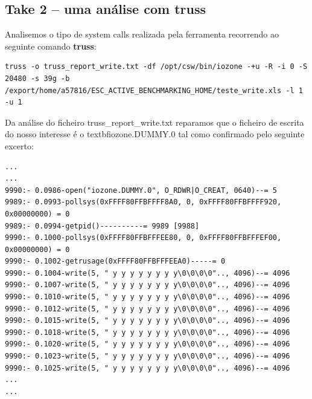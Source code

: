 \documentclass[a4paper]{article}
\begin{document}
{\subsection{Take 2 -- uma análise com truss}

Analisemos o tipo de system calls realizada pela ferramenta recorrendo ao seguinte comando \textbf{truss}:

\begin{lstlisting}[style=command]
truss -o truss_report_write.txt -df /opt/csw/bin/iozone -+u -R -i 0 -S 20480 -s 39g -b /export/home/a57816/ESC_ACTIVE_BENCHMARKING_HOME/teste_write.xls -l 1 -u 1 
\end{lstlisting}

Da análise do ficheiro truss\_report\_write.txt reparamos que o ficheiro de escrita do nosso interesse é o textbf{iozone.DUMMY.0} tal como confirmado pelo seguinte excerto: 
\begin{lstlisting}
...
...
9990:- 0.0986-open("iozone.DUMMY.0", O_RDWR|O_CREAT, 0640)--= 5
9989:- 0.0993-pollsys(0xFFFF80FFBFFFF8A0, 0, 0xFFFF80FFBFFFF920, 0x00000000) = 0
9989:- 0.0994-getpid()----------= 9989 [9988]
9990:- 0.1000-pollsys(0xFFFF80FFBFFFEE80, 0, 0xFFFF80FFBFFFEF00, 0x00000000) = 0
9990:- 0.1002-getrusage(0xFFFF80FFBFFFEEA0)-----= 0
9990:- 0.1004-write(5, " y y y y y y y y\0\0\0\0".., 4096)--= 4096
9990:- 0.1007-write(5, " y y y y y y y y\0\0\0\0".., 4096)--= 4096
9990:- 0.1010-write(5, " y y y y y y y y\0\0\0\0".., 4096)--= 4096
9990:- 0.1012-write(5, " y y y y y y y y\0\0\0\0".., 4096)--= 4096
9990:- 0.1015-write(5, " y y y y y y y y\0\0\0\0".., 4096)--= 4096
9990:- 0.1018-write(5, " y y y y y y y y\0\0\0\0".., 4096)--= 4096
9990:- 0.1020-write(5, " y y y y y y y y\0\0\0\0".., 4096)--= 4096
9990:- 0.1023-write(5, " y y y y y y y y\0\0\0\0".., 4096)--= 4096
9990:- 0.1025-write(5, " y y y y y y y y\0\0\0\0".., 4096)--= 4096
...
...
\end{lstlisting}

}
\end{document}
